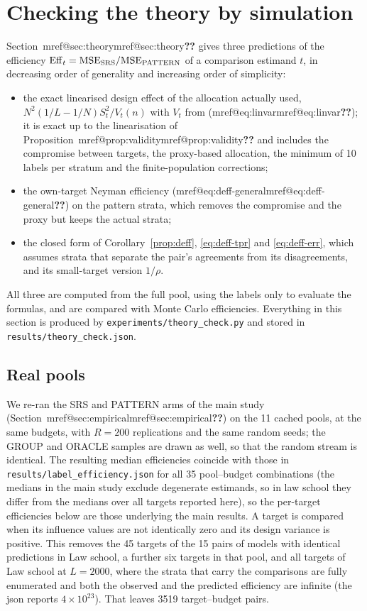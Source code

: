 \documentclass[pdflatex,sn-mathphys-num,iicol]{sn-jnl}
\makeatletter
\theoremstyle{thmstyleone}
\theoremstyle{thmstyletwo}
\theoremstyle{thmstylethree}
\newcommand{\Mref}[1]{\ifcsname mref@#1\endcsname\csname mref@#1\endcsname\else\textbf{??}\fi}
\makeatother
\begin{document}
\section{Checking the theory by simulation}\label{sec:simulation}

Section~\Mref{sec:theory} gives three predictions of the efficiency $\mathrm{Eff}_t=\mathrm{MSE}_{\rm SRS}/\mathrm{MSE}_{\rm PATTERN}$
of a comparison estimand $t$, in decreasing order of generality and increasing order of
simplicity:
\begin{itemize}
\item[LIN] the exact linearised design effect of the allocation actually used,
$N^2(1/L-1/N)S^2_t/V_t(n)$ with $V_t$ from (\Mref{eq:linvar}); it is exact up to the linearisation
of Proposition~\Mref{prop:validity} and includes the compromise between targets, the proxy-based
allocation, the minimum of 10 labels per stratum and the finite-population corrections;
\item[OWN] the own-target Neyman efficiency (\Mref{eq:deff-general}) on the pattern strata, which
removes the compromise and the proxy but keeps the actual strata;
\item[FORM] the closed form of Corollary~\ref{prop:deff}, \eqref{eq:deff-tpr} and
\eqref{eq:deff-err}, which assumes strata that separate the pair's agreements from its
disagreements, and its small-target version $1/\rho$.
\end{itemize}
All three are computed from the full pool, using the labels only to evaluate the formulas, and are
compared with Monte Carlo efficiencies. Everything in this section is produced by
\texttt{experiments/theory\_check.py} and stored in \texttt{results/theory\_check.json}.

\subsection{Real pools}\label{sec:sim-real}

We re-ran the SRS and PATTERN arms of the main study (Section~\Mref{sec:empirical}) on the 11 cached
pools, at the same budgets, with $R=200$ replications and the same random seeds; the GROUP and ORACLE
samples are drawn as well, so that the random stream is identical. The resulting median efficiencies
coincide with those in \texttt{results/label\_efficiency.json} for all 35 pool--budget
combinations (the medians in the main study exclude degenerate estimands, so in law school they differ from the medians over all targets reported here), so the per-target efficiencies below are those underlying the main results. A
target is compared when its influence values are not identically zero and its design variance is
positive. This removes the 45 targets of the 15 pairs of models with identical predictions in
Law school, a further six targets in that pool, and all targets of Law school at $L=2000$, where the
strata that carry the comparisons are fully enumerated and both the observed and the predicted
efficiency are infinite (the json reports $4\times10^{23}$). That leaves 3519 target--budget pairs.
\end{document}
